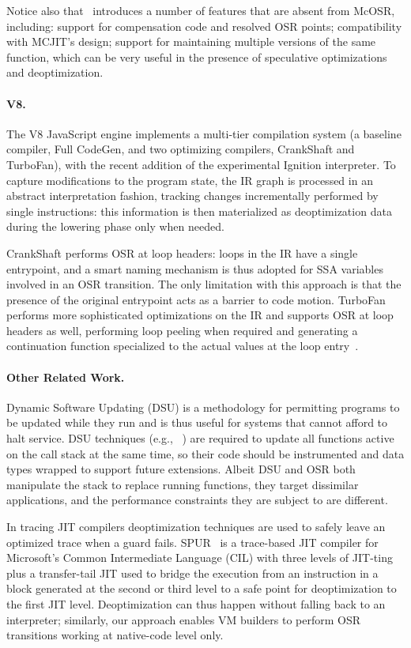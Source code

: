 Notice also that \osrkit\ introduces a number of features that are absent from McOSR, including: support for compensation code and resolved OSR points; compatibility with MCJIT's design; support for maintaining multiple versions of the same function, which can be very useful in the presence of speculative optimizations and deoptimization.

\paragraph*{V8.} The V8 JavaScript engine implements a multi-tier compilation system (a baseline compiler, Full CodeGen, and two optimizing compilers, CrankShaft and TurboFan), with the recent addition of the experimental Ignition interpreter. To capture modifications to the program state, the IR graph is processed in an abstract interpretation fashion, tracking changes incrementally performed by single instructions: this information is then materialized as deoptimization data during the lowering phase only when needed.

CrankShaft performs OSR at loop headers: loops in the IR have a single entrypoint, and a smart naming mechanism is thus adopted for SSA variables involved in an OSR transition. The only limitation with this approach is that the presence of the original entrypoint acts as a barrier to code motion. TurboFan performs more sophisticated optimizations on the IR and supports OSR at loop headers as well, performing loop peeling when required and generating a continuation function specialized to the actual values at the loop entry~\cite{titzer16}.

\paragraph*{Other Related Work.}
Dynamic Software Updating (DSU) is a methodology for permitting programs to be updated while they run and is thus useful for systems that cannot afford to halt service. DSU techniques (e.g., ~\cite{Neamtiu06,Makris09}) are required to update all functions active on the call stack at the same time, so their code should be instrumented and data types wrapped to support future extensions. Albeit DSU and OSR both manipulate the stack to replace running functions, they target dissimilar applications, and the performance constraints they are subject to are different. 

In tracing JIT compilers deoptimization techniques are used to safely leave an optimized trace when a guard fails. SPUR~\cite{Bebenita10} is a trace-based JIT compiler for Microsoft's Common Intermediate Language (CIL) with three levels of JIT-ting plus a transfer-tail JIT used to bridge the execution from an instruction in a block generated at the second or third level to a safe point for deoptimization to the first JIT level. Deoptimization can thus happen without falling back to an interpreter; similarly, our approach enables VM builders to perform OSR transitions working at native-code level only.

